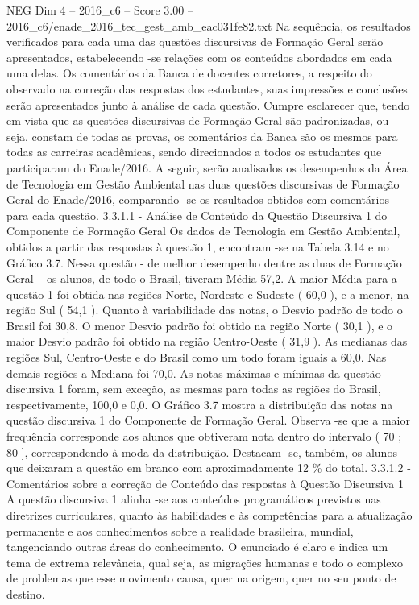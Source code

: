 \begin{textsample}{NEG Dim 4 – 2016\_c6 – Score 3.00 – 2016\_c6/enade\_2016\_tec\_gest\_amb\_eac031fe82.txt}
Na sequência, os resultados verificados para cada uma das questões discursivas de Formação Geral serão apresentados, estabelecendo -se relações com os conteúdos abordados em cada uma delas.
Os comentários da Banca de docentes corretores, a respeito do observado na correção das respostas dos estudantes, suas impressões e conclusões serão apresentados junto à análise de cada questão.
Cumpre esclarecer que, tendo em vista que as questões discursivas de Formação Geral são padronizadas, ou seja, constam de todas as provas, os comentários da Banca são os mesmos para todas as carreiras acadêmicas, sendo direcionados a todos os estudantes que participaram do Enade/2016.
A seguir, serão analisados os desempenhos da Área de Tecnologia em Gestão Ambiental nas duas questões discursivas de Formação Geral do Enade/2016, comparando -se os resultados obtidos com comentários para cada questão. 3.3.1.1 - Análise de Conteúdo da Questão Discursiva 1 do Componente de Formação Geral Os dados de Tecnologia em Gestão Ambiental, obtidos a partir das respostas à questão 1, encontram -se na Tabela 3.14 e no Gráfico 3.7.
Nessa questão - de melhor desempenho dentre as duas de Formação Geral – os alunos, de todo o Brasil, tiveram Média 57,2.
A maior Média para a questão 1 foi obtida nas regiões Norte, Nordeste e Sudeste ( 60,0 ), e a menor, na região Sul ( 54,1 ).
Quanto à variabilidade das notas, o Desvio padrão de todo o Brasil foi 30,8.
O menor Desvio padrão foi obtido na região Norte ( 30,1 ), e o maior Desvio padrão foi obtido na região Centro-Oeste ( 31,9 ).
As medianas das regiões Sul, Centro-Oeste e do Brasil como um todo foram iguais a 60,0.
Nas demais regiões a Mediana foi 70,0.
As notas máximas e mínimas da questão discursiva 1 foram, sem exceção, as mesmas para todas as regiões do Brasil, respectivamente, 100,0 e 0,0.
O Gráfico 3.7 mostra a distribuição das notas na questão discursiva 1 do Componente de Formação Geral.
Observa -se que a maior frequência corresponde aos alunos que obtiveram nota dentro do intervalo ( 70 ; 80 ], correspondendo à moda da distribuição.
Destacam -se, também, os alunos que deixaram a questão em branco com aproximadamente 12 \% do total. 3.3.1.2 - Comentários sobre a correção de Conteúdo das respostas à Questão Discursiva 1 A questão discursiva 1 alinha -se aos conteúdos programáticos previstos nas diretrizes curriculares, quanto às habilidades e às competências para a atualização permanente e aos conhecimentos sobre a realidade brasileira, mundial, tangenciando outras áreas do conhecimento.
O enunciado é claro e indica um tema de extrema relevância, qual seja, as migrações humanas e todo o complexo de problemas que esse movimento causa, quer na origem, quer no seu ponto de destino.

\end{textsample}
